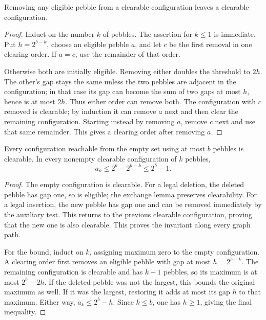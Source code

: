 \begin{lemma}
\label{tx:lem:order-clearance-exchange}
Removing any eligible pebble from a clearable configuration leaves a
clearable configuration.
\end{lemma}
\begin{proof}
Induct on the number $k$ of pebbles. The assertion for $k\le1$ is
immediate. Put $h=2^{b-k}$, choose an eligible pebble $a$, and let $c$
be the first removal in one clearing order. If $a=c$, use the remainder
of that order.

Otherwise both are initially eligible. Removing either doubles the
threshold to $2h$. The other's gap stays the same unless the two
pebbles are adjacent in the configuration; in that case its gap can
become the sum of two gaps at most $h$, hence is at most $2h$. Thus either order
can remove both. The configuration with $c$ removed is clearable;
by induction it can remove $a$ next and then clear the remaining
configuration. Starting instead by removing $a$, remove $c$ next and
use that same remainder. This gives a clearing order after removing $a$.
\end{proof}

\begin{lemma}
\label{tx:lem:order-pebble-frontier}
Every configuration reachable from the empty set using at most $b$
pebbles is clearable. In every nonempty clearable configuration of
$k$ pebbles,
\begin{equation}\label{tx:eq:order-pebble-frontier}
                     a_k\le2^b-2^{b-k}\le2^b-1.
\end{equation}
\end{lemma}
\begin{proof}
The empty configuration is clearable. For a legal deletion, the
deleted pebble has gap one, so is eligible; the exchange lemma preserves
clearability. For a legal insertion, the new pebble has gap one and
can be removed immediately by the auxiliary test. This returns to the
previous clearable configuration, proving that the new one is also
clearable. This proves the invariant along every graph path.

For the bound, induct on $k$, assigning maximum zero to the empty
configuration. A clearing order first removes an eligible pebble with
gap at most $h=2^{b-k}$. The remaining configuration is clearable and
has $k-1$ pebbles, so its maximum is at most $2^b-2h$. If the deleted
pebble was not the largest, this bounds the original maximum as well.
If it was the largest, restoring it adds at most its gap $h$ to that
maximum. Either way, $a_k\le2^b-h$. Since $k\le b$, one has $h\ge1$,
giving the final inequality.
\end{proof}

